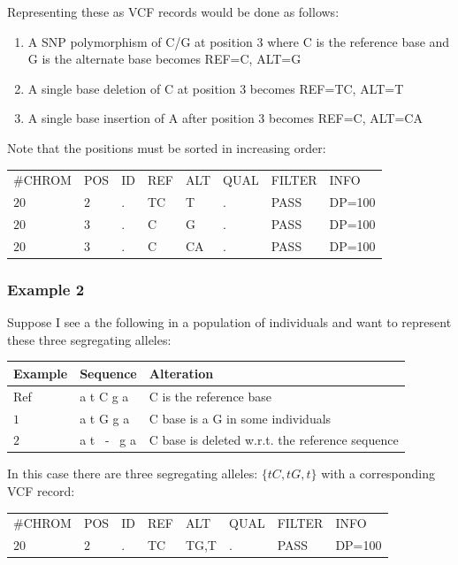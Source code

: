 \documentclass[8pt]{article}
\begin{document}
Representing these as VCF records would be done as follows:
\begin{enumerate}
  \item A SNP polymorphism of C/G at position 3 where C is the reference base and G is the alternate base becomes REF=C, ALT=G
  \item A single base deletion of C at position 3 becomes REF=TC, ALT=T
  \item A single base insertion of A after position 3 becomes REF=C, ALT=CA
\end{enumerate}

Note that the positions must be sorted in increasing order:

\vspace{0.5em}
\begin{tabular}{ l l l l l l l l}
	\#CHROM & POS & ID & REF & ALT & QUAL & FILTER & INFO \\
	$20$ & $2$ & . & TC & T & . & PASS & DP=100 \\
	$20$ & $3$ & . & C & G & . & PASS & DP=100 \\
	$20$ & $3$ & . & C & CA & . & PASS & DP=100 \\
\end{tabular}

\subsubsection{Example 2}
Suppose I see a the following in a population of individuals and want to represent these three segregating alleles:

\vspace{0.3cm}
\begin{tabular}{ | l | l | l | }
\hline
Example & Sequence & Alteration \\ \hline
Ref & a t C g a & C is the reference base \\ \hline
$1$   & a t G g a & C base is a G in some individuals \\ \hline
$2$   & a t \ - \ g a & C base is deleted w.r.t. the reference sequence \\ \hline
\end{tabular}
\vspace{0.3cm}

In this case there are three segregating alleles: $\{tC,tG,t\}$ with a corresponding VCF record:

\vspace{0.3cm}
\begin{tabular}{ l l l l l l l l}
	\#CHROM & POS & ID & REF & ALT & QUAL & FILTER & INFO \\
	$20$ & $2$ & . & TC & TG,T & . & PASS & DP=100 \\
\end{tabular}
\end{document}
